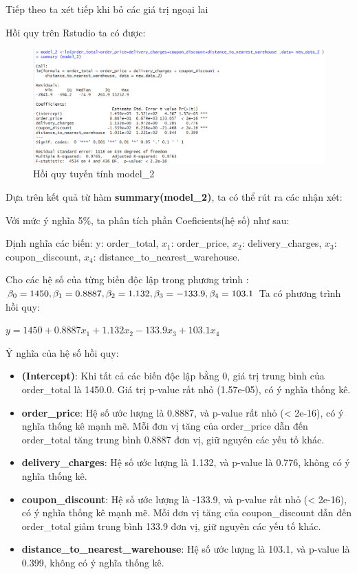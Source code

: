 Tiếp theo ta xét tiếp khi bỏ các giá trị ngoại lai

Hồi quy trên Rstudio ta có được:
\begin{figure}[ht]
  \centering
  \includegraphics[width=0.7\linewidth]{graphics/5.5.3.png}
  \caption{Hồi quy tuyến tính model\_2 }
\end{figure} 
\newpage
Dựa trên kết quả từ hàm \textbf{summary(model\_2)}, ta có thể rút ra các nhận xét:

Với mức ý nghĩa 5\%, ta phân tích phần Coeficients(hệ số) như sau:

Định nghĩa các biến:  y: order\_total, $x_1$: order\_price, $x_2$: delivery\_charges, $x_3$: coupon\_discount, $x_4$: distance\_to\_nearest\_warehouse.

Cho các hệ số của từng biến độc lập trong phương trình : $\beta_0= 1450, \beta_1= 0.8887, \\\beta_2= 1.132, \beta_3= -133.9, \beta_4= 103.1$ Ta có phương trình hồi quy: 

 \hspace{25mm}$y= 1450 + 0.8887x_1 + 1.132x_2 - 133.9x_3 + 103.1x_4$

Ý nghĩa của hệ số hồi quy:
\begin{itemize}
\item\textbf{(Intercept)}: Khi tất cả các biến độc lập bằng 0, giá trị trung bình của order\_total là 1450.0. Giá trị p-value rất nhỏ (1.57e-05), có ý nghĩa thống kê.
\item\textbf{order\_price}: Hệ số ước lượng là 0.8887, và p-value rất nhỏ (< 2e-16), có ý nghĩa thống kê mạnh mẽ. Mỗi đơn vị tăng của order\_price dẫn đến order\_total tăng trung bình 0.8887 đơn vị, giữ nguyên các yếu tố khác.\\
\item\textbf{delivery\_charges}: Hệ số ước lượng là 1.132, và p-value là 0.776, không có ý nghĩa thống kê.
\item\textbf{coupon\_discount}: Hệ số ước lượng là -133.9, và p-value rất nhỏ (< 2e-16), có ý nghĩa thống kê mạnh mẽ. Mỗi đơn vị tăng của coupon\_discount dẫn đến order\_total giảm trung bình 133.9 đơn vị, giữ nguyên các yếu tố khác.
\item\textbf{distance\_to\_nearest\_warehouse}: Hệ số ước lượng là 103.1, và p-value là 0.399, không có ý nghĩa thống kê.
\end{itemize}

